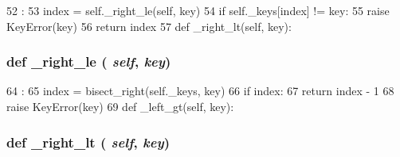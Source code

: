 \begin{DoxyCode}
52                             :
53         index = self._right_le(self, key)
54         if self._keys[index] != key:
55             raise KeyError(key)
56         return index
57 
    def _right_lt(self, key):
\end{DoxyCode}
\hypertarget{classm5_1_1util_1_1sorteddict_1_1SortedDict_aecca0782b1d8d3ed8178263d64114923}{
\subsubsection[{\_\-right\_\-le}]{\setlength{\rightskip}{0pt plus 5cm}def \_\-right\_\-le ( {\em self}, \/   {\em key})}}
\label{classm5_1_1util_1_1sorteddict_1_1SortedDict_aecca0782b1d8d3ed8178263d64114923}



\begin{DoxyCode}
64                             :
65         index = bisect_right(self._keys, key)
66         if index:
67             return index - 1
68         raise KeyError(key)
69 
    def _left_gt(self, key):
\end{DoxyCode}
\hypertarget{classm5_1_1util_1_1sorteddict_1_1SortedDict_a1406853747d03fe18f7fb02022fca513}{
\subsubsection[{\_\-right\_\-lt}]{\setlength{\rightskip}{0pt plus 5cm}def \_\-right\_\-lt ( {\em self}, \/   {\em key})}}
\label{classm5_1_1util_1_1sorteddict_1_1SortedDict_a1406853747d03fe18f7fb02022fca513}



